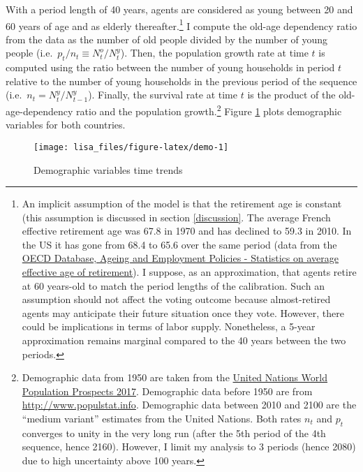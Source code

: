 \documentclass[
]{article}
\begin{document}
With a period length of 40 years, agents are considered as young between 20 and 60 years of age and as elderly thereafter.\footnote{An implicit assumption of the model is that the retirement age is constant (this assumption is discussed in section \ref{discussion}. The average French effective retirement age was 67.8 in 1970 and has declined to 59.3 in 2010. In the US it has gone from 68.4 to 65.6 over the same period (data from the \href{https://www.oecd.org/els/emp/average-effective-age-of-retirement.htm}{OECD Database, Ageing and Employment Policies - Statistics on average effective age of retirement}). I suppose, as an approximation, that agents retire at 60 years-old to match the period lengths of the calibration. Such an assumption should not affect the voting outcome because almost-retired agents may anticipate their future situation once they vote. However, there could be implications in terms of labor supply. Nonetheless, a 5-year approximation remains marginal compared to the 40 years between the two periods. } I compute the old-age dependency ratio from the data as the number of old people divided by the number of young people (i.e.~\(p_t/n_t \equiv N_t^o/N_t^y\)). Then, the population growth rate at time \(t\) is computed using the ratio between the number of young households in period \(t\) relative to the number of young households in the previous period of the sequence (i.e.~\(n_t = N_t^y/N_{t-1}^y\)). Finally, the survival rate at time \(t\) is the product of the old-age-dependency ratio and the population growth.\footnote{Demographic data from 1950 are taken from the \href{https://population.un.org/wpp/}{United Nations World Population Prospects 2017}. Demographic data before 1950 are from \url{http://www.populstat.info}. Demographic data between 2010 and 2100 are the ``medium variant'' estimates from the United Nations. Both rates \(n_t\) and \(p_t\) converges to unity in the very long run (after the 5th period of the 4th sequence, hence 2160). However, I limit my analysis to 3 periods (hence 2080) due to high uncertainty above 100 years.} Figure \ref{fig:demo} plots demographic variables for both countries.

\begin{figure}[!tb]

{\centering \texttt{[image: lisa\_files/figure-latex/demo-1]} 

}

\caption{Demographic variables time trends}\label{fig:demo}
\end{figure}
\end{document}
